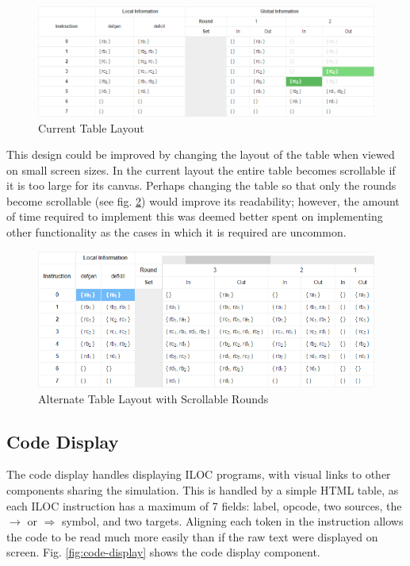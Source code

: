 \documentclass[bsc,twoside,singlespacing,parskip,logo,notimes,normalheadings]{infthesis}
\begin{document}
        \begin{figure}[!ht]
          \centering
          \includegraphics[width=\textwidth]{img/tableofresults.png}
          \caption{Current Table Layout}\label{fig:tableofresults}
        \end{figure}

        This design could be improved by changing the layout of the
        table when viewed on small screen sizes. In the current layout
        the entire table becomes scrollable if it is too large for its
        canvas. Perhaps changing the table so that only the rounds
        become scrollable (see fig. \ref{fig:tablescroll})
        would improve its readability; however, the amount of time
        required to implement this was deemed better spent on
        implementing other functionality as the cases in which it is
        required are uncommon.

        \begin{figure}[!ht]
          \centering
          \includegraphics[width=13cm]{img/tablescroll.png}
          \caption{Alternate Table Layout with Scrollable Rounds}\label{fig:tablescroll}
        \end{figure}

        \subsection{Code Display}
        The code display handles displaying ILOC programs, with visual
        links to other components sharing the simulation. This is
        handled by a simple HTML table, as each ILOC instruction has a
        maximum of 7 fields: label, opcode, two sources, the
        $\rightarrow$ or $\Rightarrow$ symbol, and two
        targets. Aligning each token in the instruction allows the
        code to be read much more easily than if the raw text were
        displayed on screen. Fig. \ref{fig:code-display} shows the
        code display component.
\end{document}
